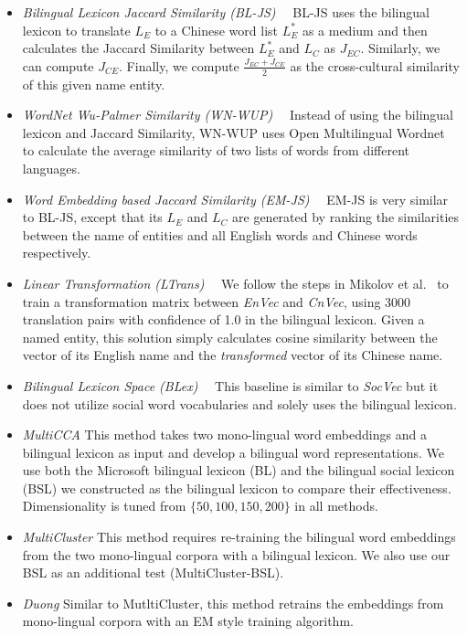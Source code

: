 \begin{itemize}
 	\item \textit{Bilingual Lexicon Jaccard Similarity (BL-JS)}~~
 	BL-JS uses the bilingual lexicon to translate $L_E$  to a Chinese word list 
 	$L_E^*$ as a medium and then calculates the Jaccard Similarity between 
 	$L_E^*$ and $L_C$ as $J_{EC}$. Similarly, we can compute $J_{CE}$. 
 	Finally, we compute $\frac{J_{EC}+J_{CE}}{2}$ as the cross-cultural similarity 
 	of this given name entity.
 	
 	\item 	\textit{WordNet Wu-Palmer Similarity (WN-WUP)}~~ Instead of using 
 	the bilingual lexicon and Jaccard Similarity, WN-WUP uses Open Multilingual 
 	Wordnet~\cite{wang2013building,bond2013linking} to calculate the average 
 	similarity of two lists of words from different languages.
 	
 	\item \textit {Word Embedding based Jaccard Similarity (EM-JS)}~~ EM-JS is 
 	very similar to BL-JS, except that its $L_E$ and $L_C$ are generated by 
 	ranking the similarities between the name of entities and all English words 
 	and Chinese words respectively. 
 	
 	\item \textit {Linear Transformation (LTrans)}~~
 	We follow the steps in Mikolov et al.~ 
 	to train a transformation matrix between \textit{EnVec} and \textit{CnVec}, 
 	using 3000 translation pairs with confidence of 1.0 in the bilingual lexicon. 
 	Given a named entity, this solution simply calculates cosine similarity 
 	between the vector of its English name and the \textit{transformed} vector 
 	of its Chinese name. 
 	
 	\item 	\textit {Bilingual Lexicon Space (BLex)}~~
 	This baseline is similar to \textit{SocVec} but it does not 
 	utilize social word vocabularies and solely uses the bilingual lexicon.
 	
 	\item	\textit{MultiCCA}
 	\cite{ammar2016massively} This method takes two mono-lingual word 
embeddings and a bilingual lexicon as input and develop a bilingual word 
representations.  We use both the Microsoft bilingual lexicon (BL)
and the bilingual social lexicon (BSL) we constructed as the bilingual lexicon
to compare their effectiveness. Dimensionality is tuned from 
$\{50,100,150,200\}$ in all methods.
 	\item 	\textit{MultiCluster} \cite{ammar2016massively} 
 	This method requires re-training the bilingual word embeddings from the two mono-lingual corpora with a bilingual lexicon. We also use our BSL as 
an additional test (MultiCluster-BSL). 
 	\item	\textit{Duong} 
 	\cite{duong2016learning}
 	Similar to MutltiCluster, this method retrains the embeddings from 
mono-lingual corpora with an EM style training algorithm. 


\end{itemize}
